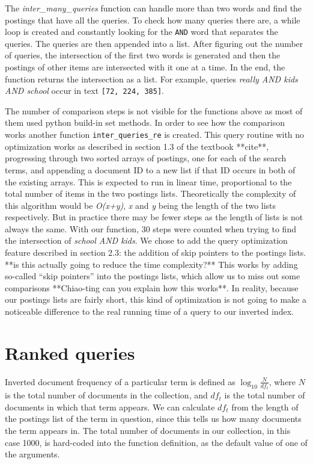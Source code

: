 \documentclass{article}
\begin{document}
The \textit{inter\_many\_queries} function can handle more than two words and find the postings that have all the queries. To check how many queries there are, a while loop is created and constantly looking for the \texttt{AND} word that separates the queries. The queries are then appended into a list. After figuring out the number of queries, the intersection of the first two words is generated and then the postings of other items are intersected with it one at a time. In the end, the function returns the intersection as a list. For example, queries \textit{really AND kids AND school} occur  in text \texttt{[72, 224, 385]}. 

The number of comparison steps is not visible for the functions above as most of them used python build-in set methods. In order to see how the comparison works another function \texttt{inter\_queries\_re} is created. This query routine with no optimization works as described in section 1.3 of the textbook **cite**, progressing through two sorted arrays of postings, one for each of the search terms, and appending a document ID to a new list if that ID occurs in both of the existing arrays. This is expected to run in linear time, proportional to the total number of items in the two postings lists. Theoretically the complexity of this algorithm would be \textit{O(x+y)}, \textit{x} and \textit{y} being the length of the two lists respectively. But in practice there may be fewer steps as the length of lists is not always the same. With our function, 30 steps were counted when trying to find the intersection of \textit{school AND kids}. 
We chose to add the query optimization feature described in section 2.3: the addition of skip pointers to the postings lists. **is this actually going to reduce the time complexity?** This works by adding so-called ``skip pointers'' into the postings lists, which allow us to miss out some comparisons **Chiao-ting can you explain how this works**. In reality, because our postings lists are fairly short, this kind of optimization is not going to make a noticeable difference to the real running time of a query to our inverted index. 

\section{Ranked queries}
Inverted document frequency of a particular term is defined as $\log_10 \frac{N}{df_t}$, where $N$ is the total number of documents in the collection, and $df_t$ is the total number of documents in which that term appears. We can calculate $df_t$ from the length of the postings list of the term in question, since this tells us how many documents the term appears in. The total number of documents in our collection, in this case 1000, is hard-coded into the function definition, as the default value of one of the arguments. 
\end{document}
